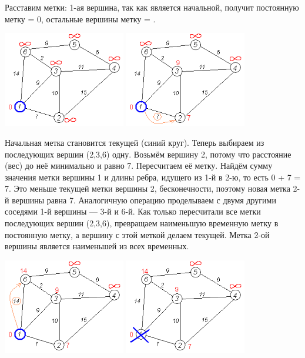 \documentclass[12pt, a4paper, oneside]{article}
\theoremstyle{plain} %
\theoremstyle{definition}
\begin{document}
Расставим метки: 1-ая вершина, так как является начальной, получит постоянную метку = 0, остальные вершины метку = \infty.

\includegraphics[width=0.4\textwidth]{Dijkstra/Dijkstra_graph2.png}
\includegraphics[width=0.4\textwidth]{Dijkstra/Dijkstra_graph3.png}

Начальная метка становится текущей (синий круг). Теперь выбираем из последующих вершин (2,3,6) одну. Возьмём вершину 2, потому что расстояние (вес) до неё минимально и равно 7. Пересчитаем её метку. Найдём сумму значения метки вершины 1 и длины ребра, идущего из 1-й в 2-ю, то есть 0 + 7 = 7. Это меньше текущей метки вершины 2, бесконечности, поэтому новая метка 2-й вершины равна 7.
Аналогичную операцию проделываем с двумя другими соседями 1-й вершины — 3-й и 6-й. Как только пересчитали все метки последующих вершин (2,3,6), превращаем наименьшую временную метку в постоянную метку, а вершину с этой меткой делаем текущей. Метка 2-ой вершины является наименьшей из всех временных.

\includegraphics[width=0.4\textwidth]{Dijkstra/Dijkstra_graph5.png}
\includegraphics[width=0.4\textwidth]{Dijkstra/Dijkstra_graph6.png}
\end{document}
